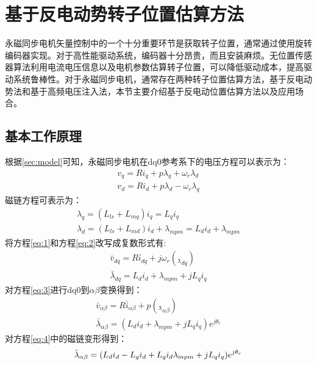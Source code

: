 \section{基于反电动势转子位置估算方法}
永磁同步电机矢量控制中的一个十分重要环节是获取转子位置，通常通过使用旋转编码器实现。对于高性能驱动系统，编码器十分昂贵，而且安装麻烦。无位置传感器算法利用电流电压信息以及电机参数估算转子位置，可以降低驱动成本，提高驱动系统鲁棒性。对于永磁同步电机，通常存在两种转子位置估算方法，基于反电动势法和基于高频电压注入法，本节主要介绍基于反电动位置估算方法以及应用场合。
\subsection{基本工作原理}
根据\ref{sec:model}可知，永磁同步电机在dq0参考系下的电压方程可以表示为：
\begin{equation}
\begin{gathered}
v_{q}=Ri_{q}+p\lambda_{q}+\omega_{r}\lambda_{d} \\ v_{d}=Ri_{d}+p\lambda_{d}-\omega_{r}\lambda_{q}
\end{gathered}\label{eq:1}
\end{equation}
磁链方程可表示为：
\begin{equation}
\begin{gathered}
\lambda_{q}=(L_{ls}+L_{mq})i_{q}=L_{q}i_{q}\\ \lambda_{d}=(L_{ls}+L_{md})i_{d}+\lambda_{mpm}=L_{d}i_{d}+\lambda_{mpm}
\end{gathered}\label{eq:2}
\end{equation}
将方程\ref{eq:1}和方程\ref{eq:2}改写成复数形式有:
\begin{equation}
\begin{gathered}
\bar{v}_{dq}=R\bar{i}_{dq}+j\omega_{r}(\bar{_\lambda}_{dq})\\\bar{\lambda}_{dq}=L_{d}i_{d}+\lambda_{mpm}+jL_{q}i_{q}
\end{gathered}\label{eq:3}
\end{equation}
对方程\ref{eq:3}进行dq0到$\alpha\beta$变换得到：
\begin{equation}\label{eq:vol1}
\begin{gathered}
\bar{v}_{\alpha\beta}=R\bar{i}_{\alpha\beta}+p(\bar{_\lambda}_{\alpha\beta})\\\bar{\lambda}_{\alpha\beta}=(L_{d}i_{d}+\lambda_{mpm}+jL_{q}i_{q})e^{j\theta_{r}}
\end{gathered}\label{eq:4}
\end{equation}
对方程\ref{eq:4}中的磁链变形得到：
\begin{equation}\label{eq:5}
\bar{\lambda}_{\alpha\beta}=(L_{d}i_{d}-L_{q}i_{d}+L_{q}i_{d}\\\lambda_{mpm}+jL_{q}i_{q})e^{j\theta_{r}}
\end{equation}
